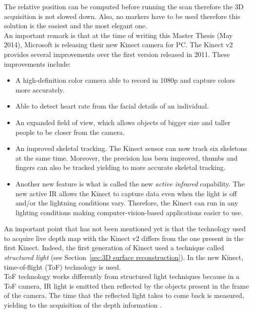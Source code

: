 The relative position can be computed before running the scan therefore the 3D acquisition is not slowed down. Also, no markers have to be used therefore this solution is the easiest and the most elegant one.\\

An important remark is that at the time of writing this Master Thesis (May 2014), Microsoft is releasing their new Kinect camera for PC. The Kinect v2 provides several improvements over the first version released in 2011. These improvements include:\\

\begin{itemize}
  \item A high-definition color camera able to record in 1080p and capture colors more accurately.
  \item Able to detect heart rate from the facial details of an individual.
  \item An expanded field of view, which allows objects of bigger size and taller people to be closer from the camera.
  \item An improved skeletal tracking. The Kinect sensor can now track six skeletons at the same time. Moreover, the precision has been improved, thumbs and fingers can also be tracked yielding to more accurate skeletal tracking.
  \item Another new feature is what is called the new \textit{active infrared} capability. The new active IR allows the Kinect to capture data even when the light is off and/or the lightning conditions vary. Therefore, the Kinect can run in any lighting conditions making computer-vision-based applications easier to use. 
\end{itemize}


An important point that has not been mentioned yet is that the technology used to acquire live depth map with the Kinect v2 differs from the one present in the first Kinect. Indeed, the first generation of Kinect used a technique called \textit{structured light} (see Section~\ref{sec:3D surface reconstruction}). In the new Kinect, time-of-flight (ToF) technology is used. \\

ToF technology works differently from structured light techniques because in a ToF camera, IR light is emitted then reflected by the objects present in the frame of the camera. The time that the reflected light takes to come back is measured, yielding to the acquisition of the depth information \cite{kolb_time--flight_2010}.\\

